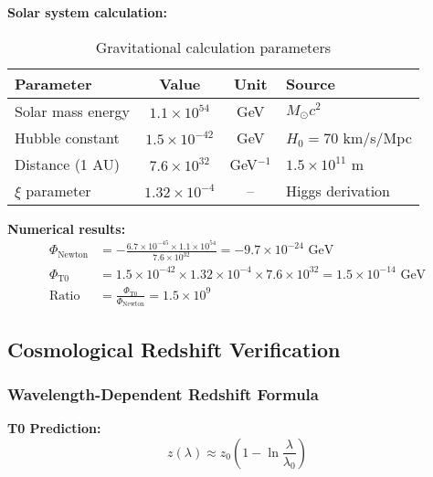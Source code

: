 \documentclass[12pt,a4paper]{article}
\begin{document}
	\textbf{Solar system calculation:}
	\begin{table}[htbp]
		\centering
		\caption{Gravitational calculation parameters}
		\label{tab:gravity_parameters}
		\begin{tabular}{lccl}
			\toprule
			\textbf{Parameter} & \textbf{Value} & \textbf{Unit} & \textbf{Source} \\
			\midrule
			Solar mass energy & $1.1 \times 10^{54}$ & GeV & $M_{\odot}c^2$ \\
			Hubble constant & $1.5 \times 10^{-42}$ & GeV & $H_0 = 70$ km/s/Mpc \\
			Distance (1 AU) & $7.6 \times 10^{32}$ & GeV$^{-1}$ & $1.5 \times 10^{11}$ m \\
			$\xi$ parameter & $1.32 \times 10^{-4}$ & -- & Higgs derivation \\
			\bottomrule
		\end{tabular}
	\end{table}
	
	\textbf{Numerical results:}
	\begin{align}
		\Phi_{\text{Newton}} &= -\frac{6.7 \times 10^{-45} \times 1.1 \times 10^{54}}{7.6 \times 10^{32}} = -9.7 \times 10^{-24} \text{ GeV} \nonumber \\
		\Phi_{\text{T0}} &= 1.5 \times 10^{-42} \times 1.32 \times 10^{-4} \times 7.6 \times 10^{32} = 1.5 \times 10^{-14} \text{ GeV} \nonumber \\
		\text{Ratio} &= \frac{\Phi_{\text{T0}}}{\Phi_{\text{Newton}}} = 1.5 \times 10^{9}
		\label{eq:gravity_results_verification}
	\end{align}
	
	\subsection{Cosmological Redshift Verification}
	\label{subsec:redshift_verification}
	
	\subsubsection{Wavelength-Dependent Redshift Formula}
	
	\textbf{T0 Prediction:}
	\begin{equation}
		z(\lambda) \approx z_0\left(1 - \ln\frac{\lambda}{\lambda_0}\right)
		\label{eq:redshift_formula_verification}
	\end{equation}
	
\end{document}
